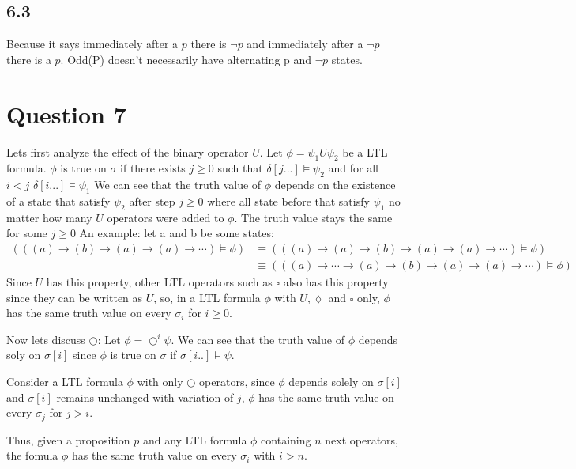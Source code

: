 \documentclass[a4paper, 11pt]{article}
\begin{document}
\subsection*{6.3}
Because it says immediately after a $p$ there is $\neg p$ and immediately after a $\neg p$ there is a $p$. Odd(P) doesn't necessarily have alternating p and $\neg p$ states.


\section*{Question 7}
Lets first analyze the effect of the binary operator $U$. Let $\phi=\psi_1 U \psi_2$ be a LTL formula. $\phi$ is true on $\sigma$ if there exists $j \geq 0$ such that $\delta[j...] \models \psi_2$ and for all $i < j$ $\delta[i...] \models \psi_1$ We can see that the truth value of $\phi$ depends on the existence of a state that satisfy $\psi_2$ after step $j \geq 0$ where all state before that satisfy $\psi_1$ no matter how many $U$ operators were added to $\phi$. The truth value stays the same for some $j \geq 0$
An example: let a and b be some states:
\begin{align*}
  (((a) \rightarrow (b) \rightarrow (a) \rightarrow (a) \rightarrow \cdots )\models \phi )
   & \equiv (((a) \rightarrow (a) \rightarrow (b) \rightarrow (a)\rightarrow (a) \rightarrow \cdots )\models \phi)                  \\
   & \equiv (((a) \rightarrow \cdots \rightarrow(a)\rightarrow (b) \rightarrow (a)\rightarrow (a) \rightarrow \cdots )\models \phi)
\end{align*}
Since $U$ has this property, other LTL operators such as $\square$ also has this property since they can be written as $U$, so, in a LTL formula $\phi$ with $U, \lozenge$ and $\square$ only,  $\phi$
has the same truth value on every $\sigma_i$ for $i\geq 0$.

Now lets discuss $\bigcirc$: Let $\phi=\bigcirc^i \psi$. We can see that the truth value of $\phi$ depends soly on $\sigma[i]$ since $\phi$ is true on $\sigma$ if $\sigma[i..]\models \psi$.

Consider a LTL formula $\phi$ with only $\bigcirc$ operators, since $\phi$ depends solely on $\sigma[i]$ and $\sigma[i]$ remains unchanged with variation of $j$, $\phi$ has the same truth value on every $\sigma_j$ for $j>i$.

Thus, given a proposition $p$ and any LTL formula $\phi$ containing $n$ next operators,
the fomula $\phi$ has the same truth value on every $\sigma_i$ with $i>n$.
\end{document}
